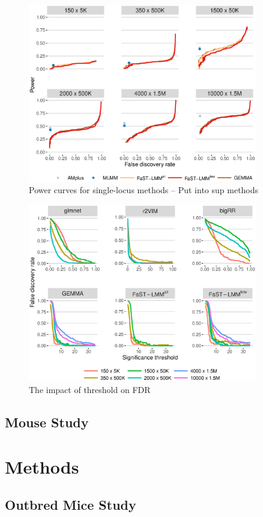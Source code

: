 \documentclass[12pt]{article}
\begin{document}
\begin{figure}
\label{fig_power_single}
\caption{Power curves for single-locus methods -- Put into sup methods}
\includegraphics[width=10cm]{powerSingle}
\end{figure}


\begin{figure}
\label{fig_threshold}
\caption{The impact of threshold on FDR }
\includegraphics[width=10cm]{threshold}
\end{figure}




\subsection{Mouse Study}

\section{Methods}

\subsection{Outbred Mice Study}
\end{document}
